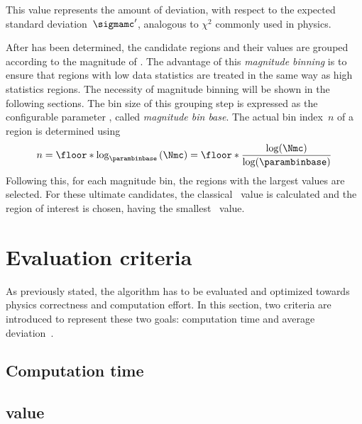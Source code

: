 This value represents the amount of deviation, with respect to the expected standard deviation~$\sigmamc'$, analogous to $\chi^2$ commonly used in physics.

After \mychi has been determined, the candidate regions and their \mychi values are grouped according to the magnitude of \Nmc. The advantage of this \emph{magnitude binning} is to ensure that regions with low data statistics are treated in the same way as high statistics regions. The necessity of magnitude binning will be shown in the following sections.
The bin size of this grouping step is expressed as the configurable parameter \parambinbase, called \emph{magnitude bin base}. The actual bin index~$n$ of a region is determined using
\begin{equation}
n = \floor*{\log_\parambinbase\left(\Nmc\right)} =  \floor*{\frac{\log(\Nmc)}{\log(\parambinbase)}}
\end{equation}
Following this, for each magnitude bin, the \paramregions regions with the largest \mychi values are selected. For these ultimate candidates, the classical \p~value is calculated and the region of interest is chosen, having the smallest \p~value.


\section{Evaluation criteria}
As previously stated, the algorithm has to be evaluated and optimized towards physics correctness and computation effort. In this section, two criteria are introduced to represent these two goals: computation time and average \ptilde deviation~\deltaptilde.

\subsection{Computation time}

\subsection{\deltaptilde value}